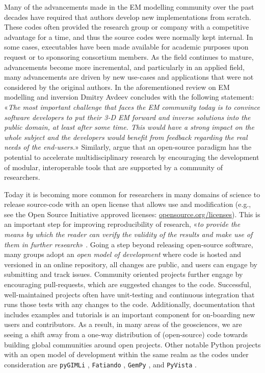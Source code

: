 \documentclass[a4paper, extra, camera,%
]{gji}
\begin{document}
Many of the advancements made in the EM modelling community over the past decades have required that authors develop new implementations from scratch. These codes often provided the research group or company with a competitive advantage for a time, and thus the source codes were normally kept internal. In some cases, executables have been made available for academic purposes upon request or to sponsoring consortium members. As the field continues to mature, advancements become more incremental, and particularly in an applied field, many advancements are driven by new use-cases and applications that were not considered by the original authors. In the aforementioned review on EM modelling and inversion Dmitry Avdeev concludes with the following statement: «\emph{The most important challenge that faces the EM community today is to convince software developers to put their 3-D EM forward and inverse solutions into the public domain, at least after some time. This would have a strong impact on the whole subject and the developers would benefit from feedback regarding the real needs of the end-users.}» Similarly, \cite{EXG.19.Oldenburg} argue that an open-source paradigm has the potential to accelerate multidisciplinary research by encouraging the development of modular, interoperable tools that are supported by a community of researchers.

Today it is becoming more common for researchers in many domains of science to release source-code with an open license that allows use and modification (e.g., see the Open Source Initiative approved licenses: \href{https://opensource.org/licenses}{opensource.org/licenses}). This is an important step for improving reproducibility of research, «\emph{to provide the means by which the reader can verify the validity of the results and make use of them in further research}» \citep{GEO.17.Broggini}. Going a step beyond releasing open-source software, many groups adopt an \emph{open model of development} where code is hosted and versioned in an online repository, all changes are public, and users can engage by submitting and track issues. Community oriented projects further engage by encouraging pull-requests, which are suggested changes to the code. Successful, well-maintained projects often have unit-testing and continuous integration that runs those tests with any changes to the code. Additionally, documentation that includes examples and tutorials is an important component for on-boarding new users and contributors. As a result, in many areas of the geosciences, we are seeing a shift away from a one-way distribution of (open-source) code towards building global communities around open projects. Other notable Python projects with an open model of development within the same realm as the codes under consideration are \texttt{pyGIMLi} \citep{CAG.17.Rucker}, \texttt{Fatiando} \citep{JOSS.18.Uieda}, \texttt{GemPy} \citep{GMD.19.DeLaVarga}, and \texttt{PyVista} \citep{JOSS.19.Sullivan}.
\end{document}
